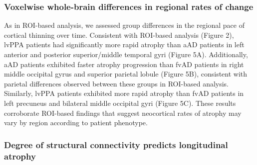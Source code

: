 \documentclass[]{article}
\begin{document}
\subsubsection*{Voxelwise whole-brain differences in regional rates of
change}\label{voxelwise-whole-brain-differences-in-regional-rates-of-change}

As in ROI-based analysis, we assessed group differences in the regional
pace of cortical thinning over time. Consistent with ROI-based analysis
(Figure 2), lvPPA patients had significantly more rapid atrophy than aAD
patients in left anterior and posterior superior/middle temporal gyri
(Figure 5A). Additionally, aAD patients exhibited faster atrophy
progression than fvAD patients in right middle occipital gyrus and
superior parietal lobule (Figure 5B), consistent with parietal
differences observed between these groups in ROI-based analysis.
Similarly, lvPPA patients exhibited more rapid atrophy than fvAD
patients in left precuneus and bilateral middle occipital gyri (Figure
5C). These results corroborate ROI-based findings that suggest
neocortical rates of atrophy may vary by region according to patient
phenotype.

\subsubsection*{Degree of structural connectivity predicts longitudinal
atrophy}\label{degree-of-structural-connectivity-predicts-longitudinal-atrophy}
\end{document}
